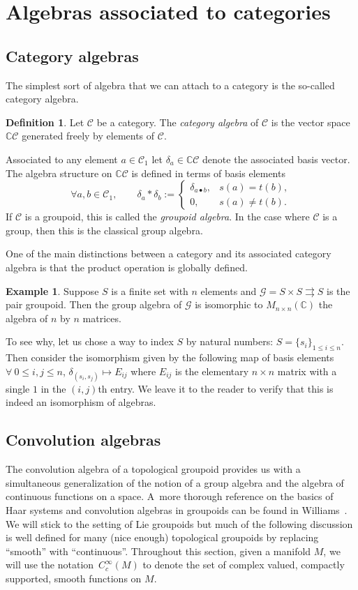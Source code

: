 \documentclass[10pt,a4paper]{amsart}
\numberwithin{equation}{section}
\theoremstyle{definition}
\newtheorem{Definition}[Theorem]{Definition}
\newtheorem{Example}[Theorem]{Example}
\newcommand{\BBC}{\mathbb{C}}
\newcommand{\CG}{\mathcal{G}}
\newcommand{\CC}{\mathcal{C}}
\newcommand{\grpd}{\rightrightarrows}
\begin{document}
\section{Algebras associated to categories}

\subsection{Category algebras}
The simplest sort of algebra that we can attach to a category is the so-called category algebra.
\begin{Definition}\label{def:category.algebra}
  Let $ \CC $ be a category. The \emph{category algebra} of $ \CC $ is the vector space $ \BBC \CC $ generated freely by elements of $ \CC $.

   Associated to any element $ a \in \CC_1 $ let $ \delta_a \in \BBC \CC $ denote the associated basis vector. The algebra structure on $ \BBC \CC $ is defined in terms of basis elements
  \[ \forall a, b \in \CC_1, \qquad \delta_a * \delta_b := \begin{cases}
    \delta_{a \bullet b}, & s(a) = t(b), \\
    0, & s(a) \neq t(b).
  \end{cases} \]
  If $ \CC $ is a groupoid, this is called the \emph{groupoid algebra}. In the case where $ \CC $ is a group, then this is the classical group algebra.
\end{Definition}
One of the main distinctions between a category and its associated category algebra is that the product operation is globally defined.
\begin{Example}
   Suppose $ S $ is a finite set with $ n $ elements and $ \CG = S \times S \grpd S $ is the pair groupoid. Then the group algebra of $ \CG $ is isomorphic to $ M_{n \times n}(\BBC) $ the algebra of $ n $ by $ n $ matrices.

   To see why, let us chose a way to index $ S $ by natural numbers: $ S = \{ s_i \}_{1 \le i \le n} $. Then consider the isomorphism given by the following map of basis elements $\forall\ 0 \le i,j \le n$, $\delta_{(s_i,s_j)} \mapsto E_{ij}$
   where $ E_{ij}$ is the elementary $ n \times n$ matrix with a single $ 1 $ in the $ (i,j)$th entry. We leave it to the reader to verify that this is indeed an isomorphism of algebras.
\end{Example}

\subsection{Convolution algebras}
The convolution algebra of a topological groupoid provides us with a simultaneous generalization of the notion of a group algebra and the algebra of continuous functions on a space. A~more thorough reference on the basics of Haar systems and convolution algebras in groupoids can be found in Williams~\cite{DanaWilliamsBook}.
We will stick to the setting of Lie groupoids but much of the following discussion is well defined for many (nice enough) topological groupoids by replacing ``smooth'' with ``continuous''. Throughout this section, given a manifold $ M $, we will use the notation~$ C_c^\infty(M)$ to denote the set of complex valued, compactly supported, smooth functions on $ M $.
\end{document}
